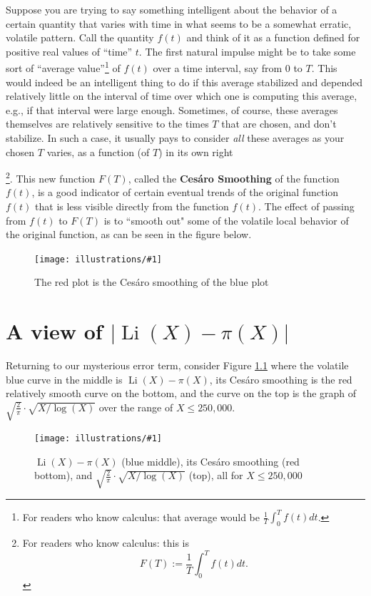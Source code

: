 \documentclass[openany]{book}
\DeclareMathOperator{\Li}{Li}
\newcommand{\ill}[3]{%
   \begin{figure}[H]%
   \vspace{-2ex}
   \centering%
   \texttt{[image: illustrations/\#1]}%
   \caption{#3}%
   \vspace{-2ex}
    \end{figure}}
\theoremstyle{plain}
\theoremstyle{definition}
\begin{document}
 Suppose you are trying to say something intelligent about the behavior of a certain quantity that varies with time in what seems to be a somewhat erratic, volatile pattern. Call the quantity $f(t)$ and think of it as a function defined for positive real values of ``time'' $t$.  The first natural impulse might be to take some sort of ``average value''\footnote{For readers who know calculus: that  average would be ${\frac{1}{T}}\int_0^Tf(t)dt$.} of  $f(t)$ over a time interval, say from $0$ to $T$.   This would indeed be an intelligent thing to do if this average stabilized and depended relatively little on  the interval of time over which one is computing this average, e.g., if that interval were large enough.  Sometimes, of course, these averages themselves are relatively sensitive to the times $T$ that are chosen, and don't stabilize. In such a case, it usually pays to consider {\it all} these averages  as  your chosen $T$ varies, as a function (of $T$) in its own right{\footnote{ For readers who know calculus: this is
  $$F(T):= {\frac{1}{T}}\int_0^Tf(t)dt.$$}.
   This new function $F(T)$, called the {\bf Ces\'aro Smoothing} of the function $f(t)$, is a good indicator of certain eventual trends of the original function $f(t)$ that is less visible directly from the function $f(t)$.  The effect of passing from $f(t)$ to $F(T)$ is to ``smooth out" some of the volatile local behavior of the original function, as can be seen in the figure below.


\ill{cesaro}{.9}{The red plot is the Ces\'aro smoothing of the blue plot}
\chapter{ A view of $|\Li(X) - \pi(X)|$}
 Returning to our mysterious error term,  consider Figure \ref{fig:li-minus-pi-250000} where the volatile blue curve in the middle
 is $\Li(X) - \pi(X)$, its Ces\'aro smoothing is the red relatively smooth curve on the bottom, and the curve on the top
 is the graph of $\sqrt{\frac{2}{\pi}}\cdot \sqrt{X/\log(X)}$ over the range of $X\le 250{,}000$.

\ill{li-minus-pi-250000}{.9}{$\Li(X)-\pi(X)$ (blue middle), its Ces\'aro smoothing (red bottom), and
$\sqrt{\frac{2}{\pi}}\cdot \sqrt{X/\log(X)}$ (top), all for $X\leq 250{,}000$\label{fig:li-minus-pi-250000}}

}
\end{document}
